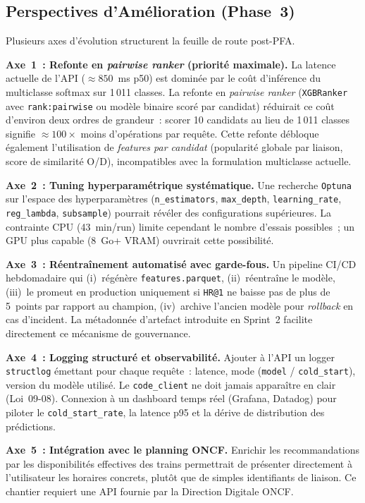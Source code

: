 \documentclass[11pt, a4paper]{article}
\begin{document}
\subsection{Perspectives d'Amélioration (Phase~3)}

Plusieurs axes d'évolution structurent la feuille de route post-PFA.

\textbf{Axe~1~: Refonte en \textit{pairwise ranker} (priorité
maximale).} La latence actuelle de l'API ($\approx 850$~ms p50) est
dominée par le coût d'inférence du multiclasse softmax sur 1\,011
classes. La refonte en \textit{pairwise ranker} (\texttt{XGBRanker}
avec \texttt{rank:pairwise} ou modèle binaire scoré par candidat)
réduirait ce coût d'environ deux ordres de grandeur~: scorer 10
candidats au lieu de 1\,011 classes signifie $\approx 100\times$ moins
d'opérations par requête. Cette refonte débloque également
l'utilisation de \textit{features par candidat} (popularité globale
par liaison, score de similarité O/D), incompatibles avec la
formulation multiclasse actuelle.

\textbf{Axe~2~: Tuning hyperparamétrique systématique.} Une recherche
\texttt{Optuna} sur l'espace des hyperparamètres
(\texttt{n\_estimators}, \texttt{max\_depth}, \texttt{learning\_rate},
\texttt{reg\_lambda}, \texttt{subsample}) pourrait révéler des
configurations supérieures. La contrainte CPU (43~min/run) limite
cependant le nombre d'essais possibles~; un GPU plus capable
(8~Go+ VRAM) ouvrirait cette possibilité.

\textbf{Axe~3~: Réentraînement automatisé avec garde-fous.} Un
pipeline CI/CD hebdomadaire qui (i)~régénère
\texttt{features.parquet}, (ii)~réentraîne le modèle, (iii)~le promeut
en production uniquement si \texttt{HR@1} ne baisse pas de plus de
5~points par rapport au champion, (iv)~archive l'ancien modèle pour
\textit{rollback} en cas d'incident. La métadonnée d'artefact
introduite en Sprint~2 facilite directement ce mécanisme de
gouvernance.

\textbf{Axe~4~: Logging structuré et observabilité.} Ajouter à l'API
un logger \texttt{structlog} émettant pour chaque requête~: latence,
mode (\texttt{model} / \texttt{cold\_start}), version du modèle utilisé.
Le \texttt{code\_client} ne doit jamais apparaître en clair (Loi~09-08).
Connexion à un dashboard temps réel (Grafana, Datadog) pour piloter
le \texttt{cold\_start\_rate}, la latence p95 et la dérive de
distribution des prédictions.

\textbf{Axe~5~: Intégration avec le planning ONCF.} Enrichir les
recommandations par les disponibilités effectives des trains permettrait
de présenter directement à l'utilisateur les horaires concrets, plutôt
que de simples identifiants de liaison. Ce chantier requiert une API
fournie par la Direction Digitale ONCF.
\end{document}
